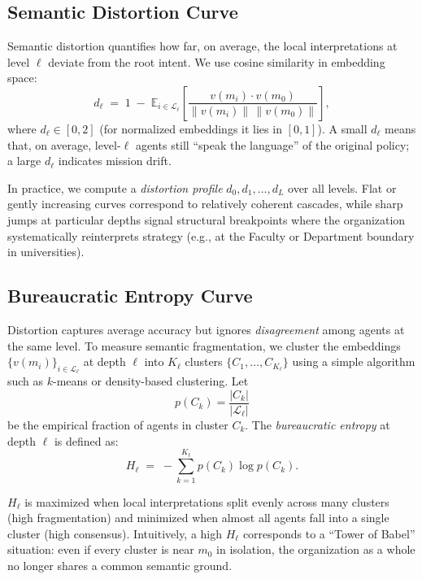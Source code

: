 \documentclass{article}
\begin{document}
\subsection{Semantic Distortion Curve}

Semantic distortion quantifies how far, on average, the local interpretations at level $\ell$ deviate from the root intent. We use cosine similarity in embedding space:
\begin{equation}
    d_\ell \;=\; 1 \;-\; \mathbb{E}_{i \in \mathcal{L}_\ell}
    \left[
        \frac{v(m_i) \cdot v(m_0)}{\|v(m_i)\| \, \|v(m_0)\|}
    \right],
    \label{eq:distortion}
\end{equation}
where $d_\ell \in [0, 2]$ (for normalized embeddings it lies in $[0, 1]$). A small $d_\ell$ means that, on average, level-$\ell$ agents still ``speak the language'' of the original policy; a large $d_\ell$ indicates mission drift.

In practice, we compute a \emph{distortion profile} $d_0, d_1, \dots, d_L$ over all levels. Flat or gently increasing curves correspond to relatively coherent cascades, while sharp jumps at particular depths signal structural breakpoints where the organization systematically reinterprets strategy (e.g., at the Faculty or Department boundary in universities).

\subsection{Bureaucratic Entropy Curve}

Distortion captures average accuracy but ignores \emph{disagreement} among agents at the same level. To measure semantic fragmentation, we cluster the embeddings $\{v(m_i)\}_{i \in \mathcal{L}_\ell}$ at depth $\ell$ into $K_\ell$ clusters $\{C_1, \dots, C_{K_\ell}\}$ using a simple algorithm such as $k$-means or density-based clustering. Let
\[
    p(C_k) = \frac{|C_k|}{|\mathcal{L}_\ell|}
\]
be the empirical fraction of agents in cluster $C_k$. The \emph{bureaucratic entropy} at depth $\ell$ is defined as:
\begin{equation}
    H_\ell \;=\; - \sum_{k=1}^{K_\ell} p(C_k) \log p(C_k).
    \label{eq:entropy}
\end{equation}

$H_\ell$ is maximized when local interpretations split evenly across many clusters (high fragmentation) and minimized when almost all agents fall into a single cluster (high consensus). Intuitively, a high $H_\ell$ corresponds to a ``Tower of Babel'' situation: even if every cluster is near $m_0$ in isolation, the organization as a whole no longer shares a common semantic ground.
\end{document}
